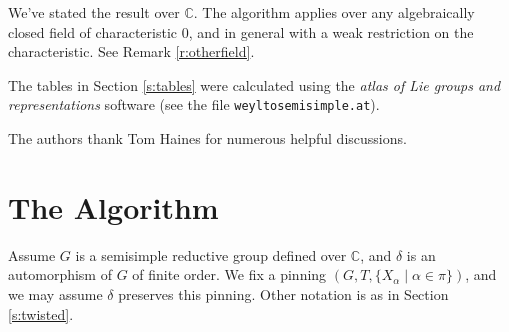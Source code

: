 \documentclass[10pt,leqno]{article}
\newcommand{\C}{\mathbb C}
\renewcommand{\sec}[1]{\section{#1}
\renewcommand{\theequation}{\thesection.\arabic{equation}}
  \setcounter{equation}{0}}
\renewcommand{\sec}[1]{\section{#1}
\renewcommand{\theequation}{\thesection.\arabic{equation}}
  \setcounter{equation}{0}}
\begin{document}
We've stated the result over $\C$. The algorithm applies over any
algebraically closed field of characteristic $0$, and in general with
a weak restriction on the characteristic. See Remark
\ref{r:otherfield}.

The tables in Section \ref{s:tables} were calculated using the
{\it atlas of Lie groups and representations} software \cite{atlas_software} (see the file {\tt weyltosemisimple.at}).

The authors thank Tom Haines for numerous helpful discussions.

\sec{The Algorithm}
\label{const}

Assume $G$ is a semisimple reductive group defined over $\C$, and
$\delta$ is an automorphism of $G$ of finite order. We fix a pinning
$(G,T,\{X_\alpha\mid\alpha\in\pi\})$, and we may assume $\delta$
preserves this pinning.  Other notation is as in Section \ref{s:twisted}.
\end{document}
